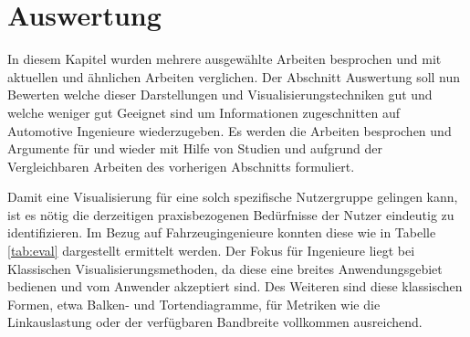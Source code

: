 \documentclass[draft=false
              ,paper=a4
              ,twoside=false
              ,fontsize=11pt
              ,headsepline
              ,BCOR10mm
              ,DIV11
              ]{scrbook}
\newcommand{\TODO}[1]{\colorbox{yellow}{\textcolor{red}{[TODO: #1]}}}
\begin{document}
\section{Auswertung} %
\label{sec:auswertung}
In diesem Kapitel wurden mehrere ausgewählte Arbeiten besprochen und mit aktuellen und ähnlichen Arbeiten verglichen. Der Abschnitt Auswertung soll nun Bewerten welche dieser Darstellungen und Visualisierungstechniken gut und welche weniger gut Geeignet sind um Informationen zugeschnitten auf Automotive Ingenieure wiederzugeben. Es werden die Arbeiten besprochen und Argumente für und wieder mit Hilfe von Studien und aufgrund der Vergleichbaren Arbeiten des vorherigen Abschnitts formuliert.

Damit eine Visualisierung für eine solch spezifische Nutzergruppe gelingen kann, ist es nötig die derzeitigen praxisbezogenen Bedürfnisse der Nutzer eindeutig zu identifizieren. Im Bezug auf Fahrzeugingenieure konnten diese wie in Tabelle \ref{tab:eval} dargestellt ermittelt werden. Der Fokus für Ingenieure liegt bei Klassischen Visualisierungsmethoden, da diese eine breites Anwendungsgebiet bedienen und vom Anwender akzeptiert sind. Des Weiteren sind diese klassischen Formen, etwa Balken- und Tortendiagramme, für Metriken wie die Linkauslastung oder der verfügbaren Bandbreite vollkommen ausreichend. 
\end{document}
